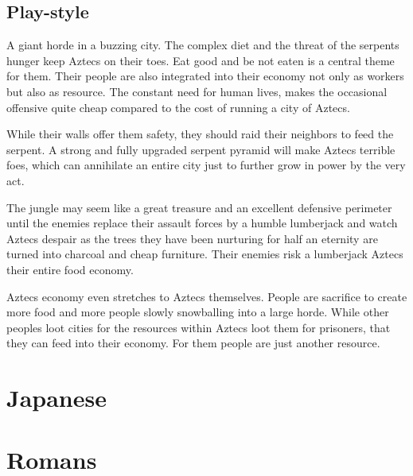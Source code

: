 \documentclass[a4paper]{article}
\begin{document}
	\subsection{Play-style}
		A giant horde in a buzzing city.
		The complex diet and the threat of the serpents hunger keep \gls{Aztecs} on their toes.
		Eat good and be not eaten is a central theme for them.
		Their people are also integrated into their economy not only as workers but also as resource.
		The constant need for human lives, makes the occasional offensive quite cheap
		compared to the cost of running a city of \gls{Aztecs}.

		While their walls offer them safety, they should raid their neighbors to feed the serpent.
		A strong and fully upgraded serpent pyramid will make \gls{Aztecs} terrible foes,
		which can annihilate an entire city just to further grow in power by the very act.

		The jungle may seem like a great treasure and an excellent defensive perimeter
		until the enemies replace their assault forces by a humble lumberjack
		and watch \gls{Aztecs} despair as the trees they have been nurturing for half an eternity
		are turned into charcoal and cheap furniture.
		Their enemies risk a lumberjack \gls{Aztecs} their entire food economy.

		\Gls{Aztecs} economy even stretches to \gls{Aztecs} themselves.
		People are sacrifice to create more food and more people slowly snowballing into a large horde.
		While other peoples loot cities for the resources within \gls{Aztecs} loot them
		for prisoners, that they can feed into their economy.
		For them people are just another resource.

\section{\Gls{Japanese}}
\section{\Gls{Romans}}

\printglossary
\end{document}
